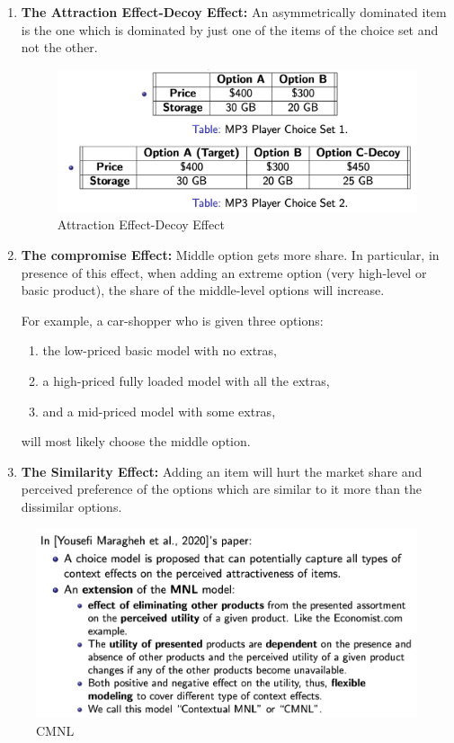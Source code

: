 \documentclass[11pt,a4paper]{article}
\begin{document}
\begin{enumerate}[$\bullet$]
    \item \textbf{The Attraction Effect-Decoy Effect:} An asymmetrically dominated item is the one which is dominated by just
    one of the items of the choice set and not the other.
    \begin{center}\begin{figure}[htbp]
        \centering
        \includegraphics[scale=0.3]{CMNL1.png}
        \caption{Attraction Effect-Decoy Effect}
        \label{}
    \end{figure}\end{center}
    \item \textbf{The compromise Effect:} Middle option gets more share. In particular, in presence of this effect, when adding an extreme option (very high-level or basic product), the share of the middle-level options will increase.
    
    For example, a car-shopper who is given three options:
    \begin{enumerate}[1.]
        \item the low-priced basic model with no extras,
        \item a high-priced fully loaded model with all the extras,
        \item and a mid-priced model with some extras,
    \end{enumerate}
    will most likely choose the middle option.
    \item \textbf{The Similarity Effect:} Adding an item will hurt the market share and perceived preference of the options which are similar to it more than the dissimilar options.
\end{enumerate}
\begin{center}\begin{figure}[htbp]
    \centering
    \includegraphics[scale=0.5]{CMNL2.png}
    \caption{CMNL}
    \label{}
\end{figure}\end{center}
\end{document}
